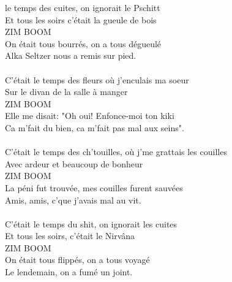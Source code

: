 
 le temps des cuites, on ignorait le Pschitt
\\Et tous les soirs c'était la gueule de bois
\\ZIM BOOM
\\On était tous bourrés, on a tous dégueulé
\\Alka Seltzer nous a remis sur pied.
\\\\C'était le temps des fleurs où j'enculais ma soeur
\\Sur le divan de la salle à manger
\\ZIM BOOM
\\Elle me disait: "Oh oui! Enfonce-moi ton kiki
\\Ca m'fait du bien, ca m'fait pas mal aux seins".
\\\\C'était le temps des ch'touilles, où j'me grattais les couilles
\\Avec ardeur et beaucoup de bonheur
\\ZIM BOOM
\\La péni fut trouvée, mes couilles furent sauvées
\\Amis, amis, c'que j'avais mal au vit.
\\\\C'était le temps du shit, on ignorait les cuites
\\Et tous les soirs, c'était le Nirvâna
\\ZIM BOOM
\\On était tous flippés, on a tous voyagé
\\Le lendemain, on a fumé un joint.

\breakpage